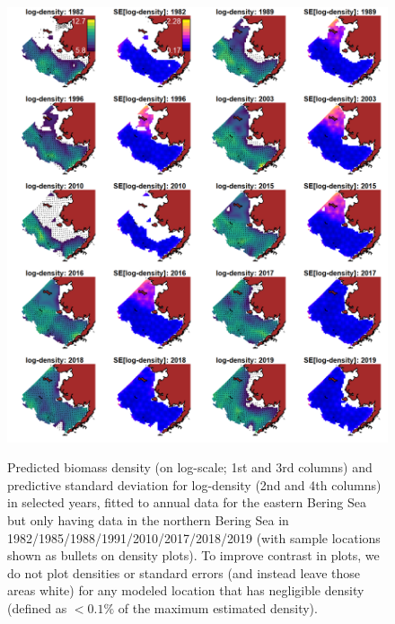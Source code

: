 \begin{figure}[!ht]
    \caption[Pollock density in eastern and northern Bering Sea]{Predicted biomass density (on log-scale; 1st and 3rd columns) and predictive standard deviation for log-density (2nd and 4th columns) in selected years, fitted to annual data for the eastern Bering Sea but only having data in the northern Bering Sea in 1982/1985/1988/1991/2010/2017/2018/2019 (with sample locations shown as bullets on density plots). To improve contrast in plots, we do not plot densities or standard errors (and instead leave those areas white) for any modeled location that has negligible density (defined as \(<0.1\%\) of the maximum estimated density).}
    \centering
    \includegraphics[width=5.5in]{Chap_8/pollock_densities_and_SEs.png}
    \label{fig:Chap8_pollock_densities}
\end{figure}

